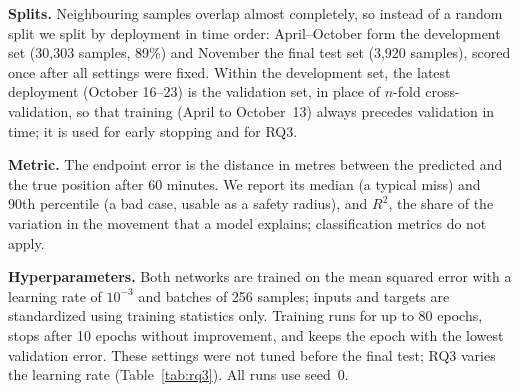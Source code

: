 \documentclass[sigconf]{acmart}
\begin{document}
\textbf{Splits.} Neighbouring samples overlap almost completely, so instead of a random split we split by deployment in time order: April--October form the development set (30{,}303 samples, 89\%) and November the final test set (3{,}920 samples), scored once after all settings were fixed. Within the development set, the latest deployment (October 16--23) is the validation set, in place of $n$-fold cross-validation, so that training (April to October~13) always precedes validation in time; it is used for early stopping and for RQ3.

\textbf{Metric.} The endpoint error is the distance in metres between the predicted and the true position after 60 minutes. We report its median (a typical miss) and 90th percentile (a bad case, usable as a safety radius), and $R^2$, the share of the variation in the movement that a model explains; classification metrics do not apply.

\textbf{Hyperparameters.}
Both networks are trained on the mean squared error with a learning rate of $10^{-3}$ and batches of 256 samples; inputs and targets are standardized using training statistics only. Training runs for up to 80 epochs, stops after 10 epochs without improvement, and keeps the epoch with the lowest validation error. These settings were not tuned before the final test; RQ3 varies the learning rate (Table~\ref{tab:rq3}). All runs use seed~0.
\end{document}
